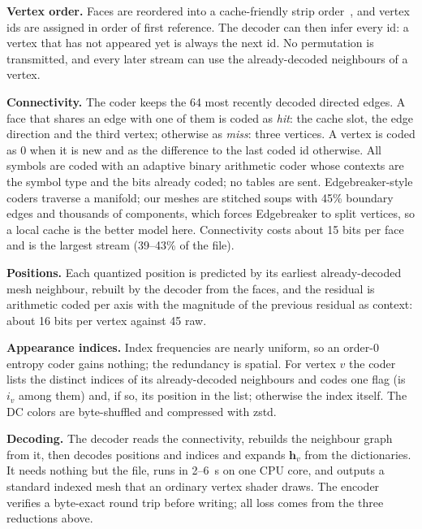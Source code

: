 \noindent\textbf{Vertex order.} Faces are reordered into a cache-friendly strip order~\cite{meshoptimizer}, and vertex ids are assigned in order of first reference. The decoder can then infer every id: a vertex that has not appeared yet is always the next id. No permutation is transmitted, and every later stream can use the already-decoded neighbours of a vertex.

\noindent\textbf{Connectivity.} The coder keeps the 64 most recently decoded directed edges. A face that shares an edge with one of them is coded as \emph{hit}: the cache slot, the edge direction and the third vertex; otherwise as \emph{miss}: three vertices. A vertex is coded as 0 when it is new and as the difference to the last coded id otherwise. All symbols are coded with an adaptive binary arithmetic coder whose contexts are the symbol type and the bits already coded; no tables are sent. Edgebreaker-style coders traverse a manifold; our meshes are stitched soups with 45\% boundary edges and thousands of components, which forces Edgebreaker to split vertices, so a local cache is the better model here. Connectivity costs about 15 bits per face and is the largest stream (39--43\% of the file).

\noindent\textbf{Positions.} Each quantized position is predicted by its earliest already-decoded mesh neighbour, rebuilt by the decoder from the faces, and the residual is arithmetic coded per axis with the magnitude of the previous residual as context: about 16 bits per vertex against 45 raw.

\noindent\textbf{Appearance indices.} Index frequencies are nearly uniform, so an order-0 entropy coder gains nothing; the redundancy is spatial. For vertex $v$ the coder lists the distinct indices of its already-decoded neighbours and codes one flag (is $i_v$ among them) and, if so, its position in the list; otherwise the index itself. The DC colors are byte-shuffled and compressed with zstd.

\noindent\textbf{Decoding.} The decoder reads the connectivity, rebuilds the neighbour graph from it, then decodes positions and indices and expands $\mathbf{h}_v$ from the dictionaries. It needs nothing but the file, runs in 2--6~s on one CPU core, and outputs a standard indexed mesh that an ordinary vertex shader draws. The encoder verifies a byte-exact round trip before writing; all loss comes from the three reductions above.
